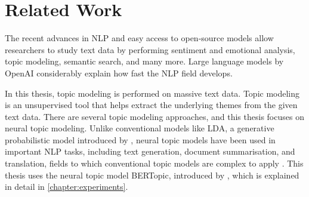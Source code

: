 
\chapter{Related Work}\label{chapter:related_work}

The recent advances in \ac{NLP} and easy access to open-source models allow researchers to 
study text data by performing sentiment and emotional analysis, topic modeling, 
semantic search, and many more. Large language models by OpenAI considerably 
explain how fast the \ac{NLP} field develops.

In this thesis, topic modeling is performed on massive text data. Topic modeling is an 
unsupervised tool that helps extract the underlying themes from the given text data. 
There are several topic modeling approaches, and this thesis focuses on neural topic modeling. 
Unlike conventional models like \ac{LDA}, a generative probabilistic 
model introduced by \textcite{blei_lda_2003}, neural topic models have been used in important \ac{NLP} 
tasks, including text generation, document summarisation, and translation, fields to 
which conventional topic models are complex to apply \parencite{zhao_neural_topic_models_2021}.
This thesis uses the neural topic model BERTopic, introduced by \textcite{bertopic}, 
which is explained in detail in \autoref{chapter:experiments}.

